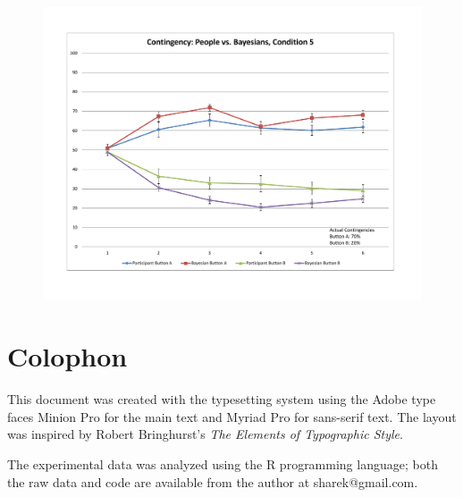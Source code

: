 \documentclass[USenglish,letterpaper,12pt,extrafontsizes,oneside,onecolumn,final]{memoir}
\begin{document}
\begin{figure}
\begin{center}
\includegraphics[width=\textwidth]{learning5}
\caption{\textsf{}\label{fig:learning5}}
\end{center}
\end{figure}
 

\backmatter



\nocite{*}

\chapter{Colophon}

This document was created with the \LaTeXe \xspace typesetting system using the Adobe type faces Minion Pro for the main text and Myriad Pro for sans-serif text. The layout was inspired by Robert Bringhurst's \textit{The Elements of Typographic Style}. 

The experimental data was analyzed using the R programming language; both the raw data and code are available from the author at sharek@gmail.com.
\vspace{3cm}



%
\end{document}
